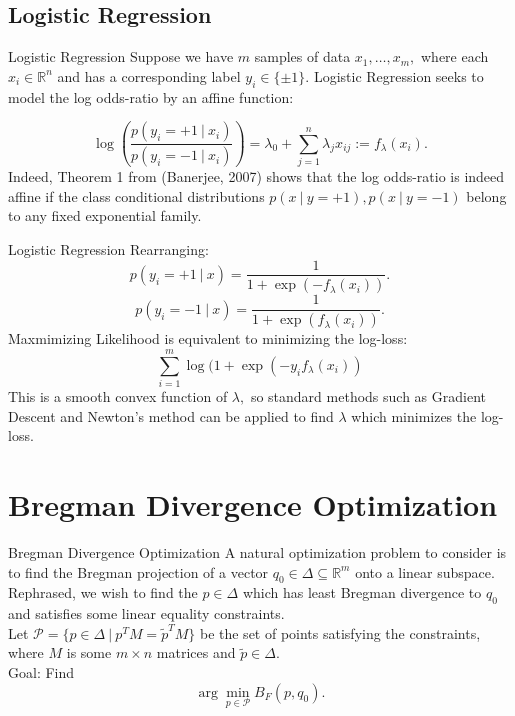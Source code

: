 \documentclass[10pt]{beamer}
\begin{document}
\subsection{Logistic Regression}

\begin{frame}{Logistic Regression}
Suppose we have $m$ samples of data $x_1,\ldots, x_m,$ where each $x_i\in \mathbb{R}^n$ and has a corresponding label $y_i \in \{\pm 1\}.$ Logistic Regression seeks to model the log odds-ratio by an affine function: 

$$ \log \left( \frac{ p(y_i= +1 \ | \ x_i)}{ p(y_i= -1 \ | \ x_i)} \right) = \lambda_0 + \sum_{j=1}^n \lambda_j x_{ij} := f_{\lambda}(x_i).$$ 
Indeed, Theorem 1 from (Banerjee, 2007) shows that the log odds-ratio is indeed affine if the class conditional distributions $p(x \ | \ y=+1), p(x \ | \ y=-1)$ belong to any fixed exponential family. 

\end{frame}

\begin{frame}{Logistic Regression}
 Rearranging: $$p(y_i = +1 \ | \ x) = \frac{1}{1+\exp(-f_{\lambda}(x_i))}.$$
 $$p(y_i = -1 \ | \ x) = \frac{1}{1+\exp(f_{\lambda}(x_i))}.$$
 Maxmimizing Likelihood is equivalent to minimizing the log-loss:
 $$\sum_{i=1}^m \log(1+ \exp( -y_i f_{\lambda}(x_i))$$
 This is a smooth convex function of $\lambda,$ so standard methods such as Gradient Descent and Newton's method can be applied to find $\lambda$ which minimizes the log-loss. 
\end{frame}



\section{Bregman Divergence Optimization}

\begin{frame}{Bregman Divergence Optimization}
A natural optimization problem to consider is to find the Bregman projection of a vector $q_0 \in \Delta \subseteq \mathbb{R}^m$ onto a linear subspace. Rephrased, we wish to find the $p\in \Delta$ which has least Bregman divergence to $q_0$ and satisfies some linear equality constraints. \
\newline \\
Let $\mathcal{P} = \{ p \in \Delta \ | \ p^TM = \tilde{p}^TM\}$ be the set of points satisfying the constraints, where $M$ is some $m\times n$ matrices and $\tilde{p}\in \Delta.$ \
\newline \\
Goal: Find $$\arg \min_{p\in \mathcal{P}} B_F(p, q_0).$$
\end{frame}
\end{document}
